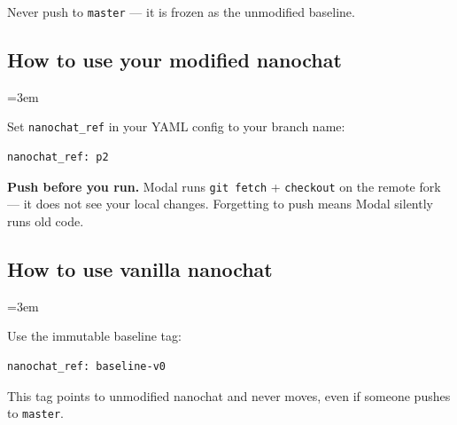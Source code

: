 \documentclass[9pt]{extarticle}
\begin{document}
Never push to \texttt{master} --- it is frozen as the unmodified baseline.

\subsection*{How to use your modified nanochat}
\leftskip=3em

Set \texttt{nanochat\_ref} in your YAML config to your branch name:

\begin{lstlisting}
nanochat_ref: p2
\end{lstlisting}

\textbf{Push before you run.} Modal runs \texttt{git fetch} + \texttt{checkout} on the remote fork --- it does not see your local changes. Forgetting to push means Modal silently runs old code.

\subsection*{How to use vanilla nanochat}
\leftskip=3em

Use the immutable baseline tag:

\begin{lstlisting}
nanochat_ref: baseline-v0
\end{lstlisting}

This tag points to unmodified nanochat and never moves, even if someone pushes to \texttt{master}.
\end{document}
